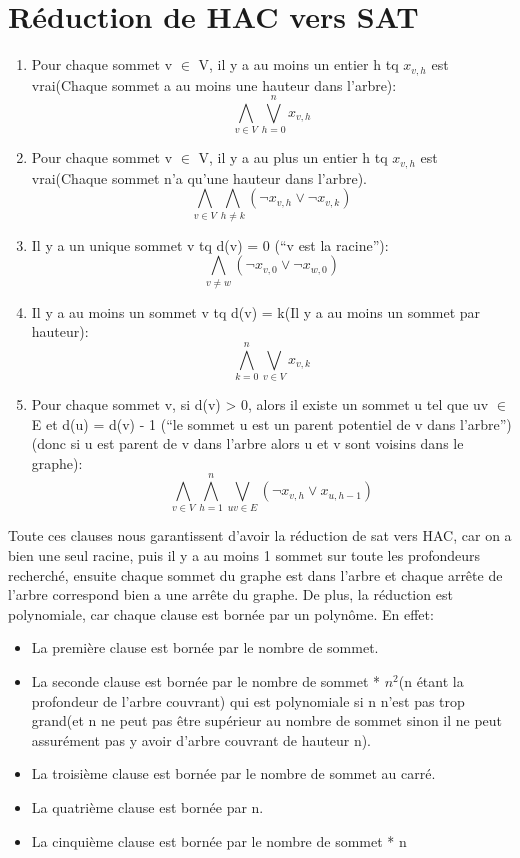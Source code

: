 \documentclass[10pt, a4paper]{article}
\begin{document}
\section {Réduction de HAC vers SAT}
\begin {enumerate}
\item Pour chaque sommet v $\in$ V, il y a au moins un entier h tq $x_{v,h}$ est vrai(Chaque sommet a au moins une hauteur dans l'arbre):
  \[
  \bigwedge_{v \in V}\bigvee_{h=0}^nx_{v,h}
  \]
\item  Pour chaque sommet v $\in$ V, il y a au plus un entier h tq $x_{v,h}$ est vrai(Chaque sommet n'a qu'une hauteur dans l'arbre).
  \[
  \bigwedge_{v\in V}\bigwedge_{h\neq k}(\neg x_{v,h} \vee \neg x_{v,k})
  \]
\item Il y a un unique sommet v tq d(v) = 0 (``v est la racine''):
  \[
  \bigwedge_{v\neq w}(\neg x_{v,0} \vee \neg x_{w,0})
  \]
\item Il y a au moins un sommet v tq d(v) = k(Il y a au moins un sommet par hauteur):
  \[
  \bigwedge_{k=0}^{n}\bigvee_{v\in V}x_{v,k}
  \]
\item Pour chaque sommet v, si d(v) > 0, alors il existe un sommet u tel que uv $\in$ E et d(u) = d(v) - 1 (``le sommet u est un parent potentiel de v dans l'arbre'')(donc si u est parent de v dans l'arbre alors u et v sont voisins dans le graphe):
  \[
  \bigwedge_{v\in V}\bigwedge_{h=1}^n\bigvee_{uv\in E}(\neg x_{v,h}\vee x_{u,h-1})
  \]
\end {enumerate}
\newpage
Toute ces clauses nous garantissent d'avoir la réduction de sat vers HAC, car on a bien une seul racine, puis il y a au moins 1 sommet sur toute les profondeurs
recherché, ensuite chaque sommet du graphe est dans l'arbre et chaque arrête de l'arbre correspond bien a une arrête du graphe.\newline
De plus, la réduction est polynomiale, car chaque clause est bornée par un polynôme.\newline
En effet:
\begin {itemize}
\item La première clause est bornée par le nombre de sommet.
\item La seconde clause est bornée par le nombre de sommet * $n^2$(n étant la profondeur de l'arbre couvrant) qui est polynomiale si n n'est pas trop grand(et n ne peut pas être supérieur au nombre de sommet sinon il ne peut assurément pas y avoir d'arbre couvrant de hauteur n).
\item La troisième clause est bornée par le nombre de sommet au carré.
\item La quatrième clause est bornée par n.
\item La cinquième clause est bornée par le nombre de sommet * n
\end {itemize}
\end{document}
